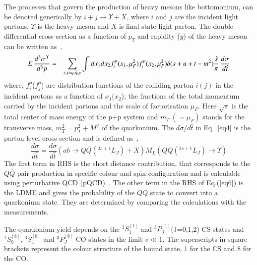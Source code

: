 
The processes that govern the production of heavy mesons like bottomonium,
can be denoted generically by 
$i+j\rightarrow \Upsilon +X$, where $i$ and $j$ are the incident light partons,
$\Upsilon$ is the heavy meson and $X$ is final state light parton.
The double differential cross-section as a function of $p_T$ and rapidity ($y$) of 
the heavy meson can be written as~\cite{Kumar:2016ojy},
\begin{eqnarray}
  E\,\frac{d^3\sigma^{\Upsilon} }{d^3p} &=& \sum_{i,j=q,\overline{q},g} \int dx_1 dx_2 f_{i}^p(x_1,\mu_F^2)
  f_{i}^p(x_2,\mu_F^2) \delta(s+u+t-m^2) {\hat{s} \over \pi} \, \frac{d\sigma}{d\hat{t}}
  \label{eq4}
\end{eqnarray}
where, $f_{i}^p$($f_{j}^p$) are distribution functions of the colliding parton $i(j)$ in
the incident protons as a function of $x_1$($x_2$); the fractions of the total momentum
carried by the incident partons and the scale of factorisation $\mu_F$.
Here $\sqrt{s}$ is the total center of mass energy of the p+p system and $m_T~(=\mu_F)$ stands for
the transverse mass, $m_T^2=p_T^2 + M^2$ of the quarkonium.
The ${d\sigma}/{d\hat{t}}$ in Eq.~\ref{eq4} is the parton level cross-section and is
defined as~\cite{Bodwin:1994jh},
\begin{equation}
  \frac{d\sigma}{d\hat{t}} = \frac{d\sigma}{d\hat{t}}(ab\rightarrow Q\bar{Q}(^{2s+1}L_J)+X)
  M_L(Q\bar{Q}(^{2s+1}L_J)\rightarrow \Upsilon)
  \label{eq6}
\end{equation}
The first term in RHS is the short distance contribution, that corresponds to the $Q\bar{Q}$
pair production in specific colour and spin configuration and is calculable using 
perturbative QCD (pQCD)~\cite{Braaten:2000cm,Baier:1983va,Humpert:1986cy,Gastmans:1987be,Cho:1995vh,Cho:1995ce}.
The other term in the RHS of Eq.(\ref{eq6}) is the LDME 
and gives the probability of the $Q\bar{Q}$ state to convert into a quarkonium state.
They are determined by comparing the calculations with the measurements.

The quarkonium yield depends on the $^3S_1^{[1]}$ 
and $^3P_J^{[1]}$(J=0,1,2) CS states and $^1S_0^{[8]}$, $^3S_1^{[8]}$ and $^3P_J^{[8]}$
CO states in the limit $v\ll 1$.
The superscripts in square brackets represent the colour structure of the bound state,
1 for the CS and 8 for the CO.



